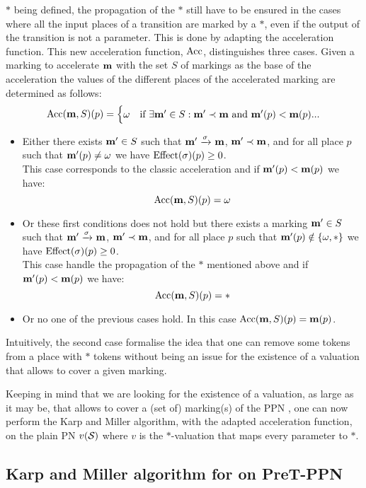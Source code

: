 $*$ being defined, the propagation of the $*$ still have to be ensured in the cases where all the input places of a transition are marked by a $*$, even if the output of the transition is not a parameter.
This is done by adapting the acceleration function.
This new acceleration function, $\operatorname{Acc}$, distinguishes three cases.
Given a marking to accelerate $\mathbf{m}$ with the set $S$ of markings as the base of the acceleration
the values of the different places of the accelerated marking are determined as follows:
\[
  \operatorname{Acc}(\mathbf{m}, S)(p) =
  \begin{cases}
    \omega & \text{if } \exists \mathbf{m'} \in S : \mathbf{m'} \prec \mathbf{m} \text{ and } \mathbf{m'}(p) < \mathbf{m}(p)
    ...
  \end{cases}
\]
\begin{itemize}
  \item Either there exists $\mathbf{m'} \in S$ such that $\mathbf{m'} \xrightarrow{\sigma}_{} \mathbf{m}$, $\mathbf{m'} \prec \mathbf{m}$, and for all place $p$ such that $\mathbf{m'}(p) \neq \omega$ we have $\effect{\sigma}(p) \geq 0$.\\
    This case corresponds to the classic acceleration and
    if $\mathbf{m'}(p) < \mathbf{m}(p)$
    we have:
    \[
      \operatorname{Acc}(\mathbf{m}, S)(p) = \omega
    \]
\item Or these first conditions does not hold but there exists a marking $\mathbf{m'} \in S$ such that $\mathbf{m'} \xrightarrow{\sigma}_{} \mathbf{m}$, $\mathbf{m'} \prec \mathbf{m}$, and for all place $p$ such that $\mathbf{m'}(p) \notin \{\omega, *\}$ we have $\effect{\sigma}(p) \geq 0$.\\
    This case handle the propagation of the $*$ mentioned above and
    if $\mathbf{m'}(p) < \mathbf{m}(p)$
    we have:
    \[
      \operatorname{Acc}(\mathbf{m}, S)(p) = *
    \]
  \item Or no one of the previous cases hold.
    In this case $\operatorname{Acc}(\mathbf{m}, S)(p) = \mathbf{m}(p)$.
\end{itemize}

Intuitively, the second case formalise the idea that one can remove some tokens from a place with $*$ tokens without being an issue for the existence of a valuation that allows to cover a given marking.

Keeping in mind that we are looking for the existence of a valuation, as large as it may be, that allows to cover a (set of) marking(s) of the \ac{PPN} \namePPN, one can now perform the Karp and Miller algorithm, with the adapted acceleration function, on the plain \ac{PN} $v(\mathcal{S}_{})$ where $v$ is the $*$-valuation that maps every parameter to $*$.

\subsection{Karp and Miller algorithm for \Ucov on PreT-\ac{PPN}}

